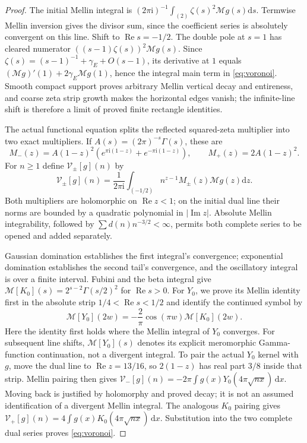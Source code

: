 \documentclass[11pt,a4paper]{article}
\numberwithin{equation}{section}
\theoremstyle{definition}
\newcommand{\dd}{\,\mathrm d}
\newcommand{\ii}{\mathrm i}
\newcommand{\Rea}{\operatorname{Re}}
\newcommand{\Ima}{\operatorname{Im}}
\newcommand{\Mell}{\mathcal M}
\begin{document}
\begin{proof}
The initial Mellin integral is
$(2\pi\ii)^{-1}\int_{(2)}\zeta(s)^2\Mell g(s)\mathrm ds$.
Termwise Mellin inversion gives the divisor sum, since the coefficient series
is absolutely convergent on this line. Shift to $\Rea s=-1/2$.
The double pole at $s=1$ has cleared numerator
$((s-1)\zeta(s))^2\Mell g(s)$. Since
$\zeta(s)=(s-1)^{-1}+\gamma_E+O(s-1)$, its derivative at $1$ equals
$(\Mell g)'(1)+2\gamma_E\Mell g(1)$, hence the integral main term in
\eqref{eq:voronoi}. Smooth compact support proves arbitrary Mellin vertical
decay and entireness, and coarse zeta strip growth makes the horizontal edges
vanish; the infinite-line shift is therefore a limit of proved finite
rectangle identities.

The actual functional equation splits the reflected squared-zeta multiplier
into two exact multipliers. If
$A(s)=(2\pi)^{-s}\Gamma(s)$, these are
\[
 M_-(z)=A(1-z)^2(e^{\pi\ii(1-z)}+e^{-\pi\ii(1-z)}),\qquad
 M_+(z)=2A(1-z)^2.
\]
For $n\ge1$ define $\mathcal V_\pm[g](n)$ by
\[
 \mathcal V_\pm[g](n)=\frac1{2\pi\ii}\int_{(-1/2)}
           n^{z-1}M_\pm(z)\Mell g(z)\mathrm dz.
\]
Both multipliers are holomorphic on $\Rea z<1$; on the initial dual line their
norms are bounded by a quadratic polynomial in $|\Ima z|$. Absolute Mellin
integrability, followed by $\sum d(n)n^{-3/2}<\infty$, permits both complete
series to be opened and added separately.

Gaussian domination establishes the first integral's convergence; exponential
domination establishes the second tail's convergence, and the oscillatory
integral is over a finite interval.
Fubini and the beta integral give
$\Mell[K_0](s)=2^{s-2}\Gamma(s/2)^2$ for $\Rea s>0$.
For $Y_0$, we prove its Mellin identity first in the absolute strip
$1/4<\Rea s<1/2$ and identify the continued symbol by
\[
 \Mell[Y_0](2w)=-\frac2\pi\cos(\pi w)\Mell[K_0](2w).
\]
Here the identity first holds where the Mellin integral of $Y_0$ converges.
For subsequent line shifts, $\Mell[Y_0](s)$ denotes its explicit meromorphic
Gamma-function continuation, not a divergent integral.
To pair the actual $Y_0$ kernel with $g$, move the dual line to
$\Rea z=13/16$, so $2(1-z)$ has real part $3/8$ inside that strip.
Mellin pairing then gives $\mathcal V_-[g](n)=-2\pi\int g(x)Y_0(4\pi\sqrt{nx})\dd x$.
Moving back is justified by holomorphy and proved decay; it is not an assumed
identification of a divergent Mellin integral. The analogous $K_0$ pairing
gives $\mathcal V_+[g](n)=4\int g(x)K_0(4\pi\sqrt{nx})\dd x$.
Substitution into the two complete dual series proves \eqref{eq:voronoi}.
\end{proof}
\end{document}
